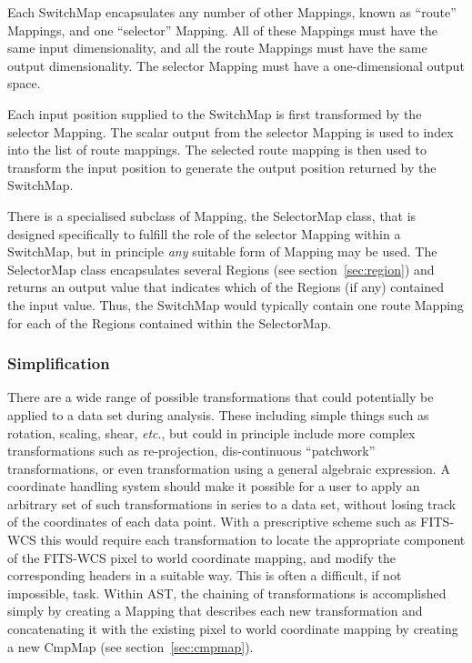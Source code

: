 \documentclass[final,authoryear,5p,times,twocolumn]{elsarticle}
\begin{document}
Each SwitchMap encapsulates any number of other Mappings, known as ``route''
Mappings, and one ``selector'' Mapping. All of these Mappings must have the
same input dimensionality, and all the route Mappings must have the same
output dimensionality. The selector Mapping must have a one-dimensional
output space.

Each input position supplied to the SwitchMap is first transformed by the
selector Mapping. The scalar output from the selector Mapping is used to
index into the list of route mappings. The selected route mapping is then
used to transform the input position to generate the output position
returned by the SwitchMap.

There is a specialised subclass of Mapping, the SelectorMap class, that
is designed specifically to fulfill the role of the selector Mapping
within a SwitchMap, but in principle \emph{any} suitable form of Mapping
may be used. The SelectorMap class encapsulates several Regions (see
section~\ref{sec:region}) and returns an output value that indicates
which of the  Regions (if any) contained the input value. Thus, the
SwitchMap would typically contain one route Mapping for each of the
Regions contained within the SelectorMap.

\subsubsection{Simplification}
\label{sec:simplification}

There are a wide range of possible transformations that could
potentially be applied to a data set during analysis. These
including simple things such as rotation, scaling, shear, \emph{etc}., but
could in principle include more complex transformations such as
re-projection, dis-continuous ``patchwork'' transformations, or even
transformation using a general algebraic expression.  A coordinate
handling system should make it possible for a user to apply an
arbitrary set of such transformations in series to a data set, without
losing track of the coordinates of each data point. With a
prescriptive scheme such as FITS-WCS this would require each
transformation to locate the appropriate component of the FITS-WCS
pixel to world coordinate mapping, and modify the corresponding
headers in a suitable way. This is often a difficult, if not
impossible, task. Within AST, the chaining of transformations is
accomplished simply by creating a Mapping that describes each new
transformation and concatenating it with the existing pixel to world
coordinate mapping by creating a new CmpMap (see section~\ref{sec:cmpmap}).
\end{document}
